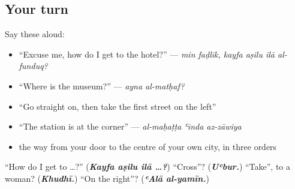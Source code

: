 \subsection*{Your turn}
Say these aloud:

\begin{itemize}
\raggedright
  \item \textquotedblleft{}Excuse me, how do I get to the hotel?\textquotedblright{} — \emph{min faḍlik, kayfa aṣilu ilā al-funduq?}
  \item \textquotedblleft{}Where is the museum?\textquotedblright{} — \emph{ayna al-matḥaf?}
  \item \textquotedblleft{}Go straight on, then take the first street on the left\textquotedblright{}
  \item \textquotedblleft{}The station is at the corner\textquotedblright{} — \emph{al-maḥaṭṭa ʿinda az-zāwiya}
  \item the way from your door to the centre of your own city, in three orders
\end{itemize}

\begin{tcolorbox}[breakable,colback=teal!4,colframe=teal!35!black,title={Before you move on}]
\textquotedblleft{}How do I get to …?\textquotedblright{} (\emph{\textbf{Kayfa aṣilu ilā …?}}) \textquotedblleft{}Cross\textquotedblright{}? (\emph{\textbf{Uʿbur.}}) \textquotedblleft{}Take\textquotedblright{}, to a woman? (\emph{\textbf{Khudhī.}}) \textquotedblleft{}On the right\textquotedblright{}? (\emph{\textbf{ʿAlā al-yamīn.}})
\end{tcolorbox}
